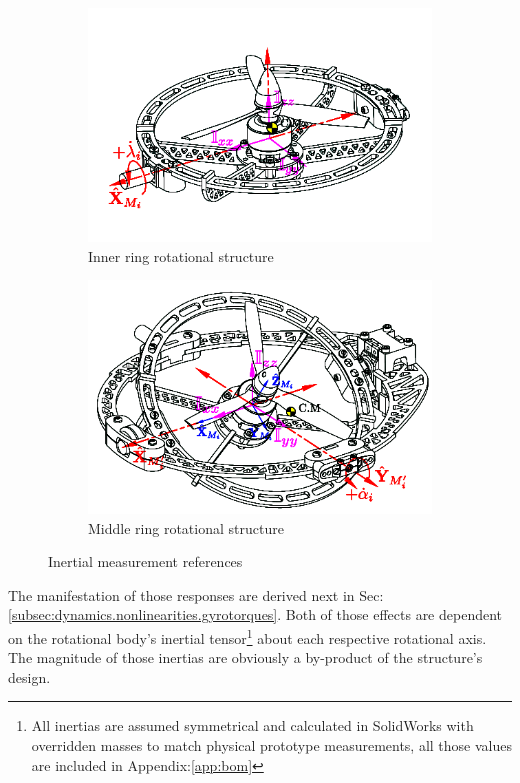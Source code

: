 \begin{figure}[htbp]
\centering
\begin{subfigure}{0.49\textwidth}
\includegraphics[width=\textwidth]{figs/inertia-inner}
\caption{Inner ring rotational structure}
\label{fig:inertia-inner}
\end{subfigure}
\begin{subfigure}{0.49\textwidth}
\includegraphics[width=\textwidth]{figs/inertia-middle}
\caption{Middle ring rotational structure}
\label{fig:inertia-middle}
\end{subfigure}
\caption{Inertial measurement references}
\end{figure}
\par
The manifestation of those responses are derived next in Sec:\ref{subsec:dynamics.nonlinearities.gyrotorques}. Both of those effects are dependent on the rotational body's inertial tensor\footnote{All inertias are assumed symmetrical and calculated in SolidWorks with overridden masses to match physical prototype measurements, all those values are included in Appendix:\ref{app:bom}} about each respective rotational axis. The magnitude of those inertias are obviously a by-product of the structure's design. 



